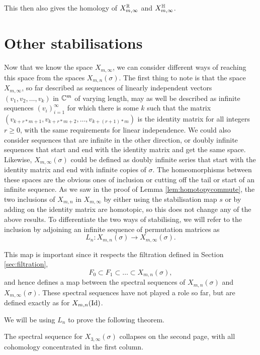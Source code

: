 This then also gives the homology of $X_{m,\infty}^{\mathbb{R}}$ and
$X_{m,\infty}^{\mathbb{H}}$.


\section{Other stabilisations}
\label{sec:stabilitet}

Now that we know the space $X_{m,\infty}$, we can consider different
ways of reaching this space from the spaces $X_{m,n}(\sigma)$. The
first thing to note is that the space $X_{m,\infty}$, so far described
as sequences of linearly independent vectors $(v_1,v_2,\dots,v_k)$ in
$\mathbb{C}^m$ of varying length, may as well be described as infinite
sequences $(v_i)_{i=1}^\infty$ for which there is some $k$ such that
the matrix $(v_{k+r*m +1},v_{k+r*m +2},\dots,v_{k+(r+1)*m})$ is the
identity matrix for all integers $r \geq 0$, with the same
requirements for
linear independence. We could also consider sequences that are
infinite in the other direction, or
doubly infinite sequences
that start and end with the identity matrix
and get the same space. Likewise, $X_{m,\infty}(\sigma)$ could be
defined as doubly infinite series that start with the identity matrix
and end with infinite copies of $\sigma$. The homeomorphisms between
these spaces are the obvious ones of inclusion or cutting off the tail
or start of an infinite sequence. As we saw in the proof of Lemma
\ref{lem:homotopycommute}, the two inclusions of $X_{m,n}$ in
$X_{m,\infty}$ by either
using the stabilisation map $s$ or by adding on the identity matrix
are homotopic, so this does not change any of the above results. To
differentiate the two ways of stabilising, we will refer to the
inclusion by adjoining an
infinite sequence of permutation matrices as
\[ L_n : X_{m,n}(\sigma) \to X_{m,\infty}(\sigma). \]

This map is important since it respects the
filtration defined in Section \ref{sec:filtration},
\[ F_0 \subset F_1 \subset \dots \subset X_{m,n}(\sigma), \]
and hence defines a map between the spectral sequences of
$X_{m,n}(\sigma)$ and $X_{m,\infty}(\sigma)$. These spectral sequences
have not played a role so far, but are defined exactly as for
$X_{m,n}(\operatorname{Id})$.

We will be using $L_n$ to prove the following theorem.
\begin{theorem}
  \label{thm:kollaps}
  The spectral sequence for $X_{3,\infty}(\sigma)$ collapses on the
  second page, with all cohomology concentrated in the first column.
\end{theorem}

